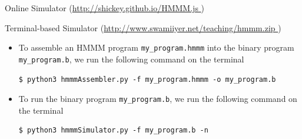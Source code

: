 \documentclass[8pt,a4paper,compress]{beamer}
\begin{document}
\begin{frame}[fragile]
\pause

Online Simulator (\href{http://shickey.github.io/HMMM.js}{http://shickey.github.io/HMMM.js \ExternalLink})

\begin{center}

\bigskip

\end{center}
\end{frame}

\begin{frame}[fragile]
\pause

Terminal-based Simulator (\href{http://www.swamiiyer.net/teaching/hmmm.zip}{http://www.swamiiyer.net/teaching/hmmm.zip \ExternalLink})
\begin{itemize}
\item To assemble an HMMM program \lstinline{my_program.hmmm} into the binary program \lstinline{my_program.b}, we run the following command on the terminal
\begin{lstlisting}[language={}]
$ python3 hmmmAssembler.py -f my_program.hmmm -o my_program.b
\end{lstlisting}

\item To run the binary program \lstinline{my_program.b}, we run the following command on the terminal
\begin{lstlisting}[language={}]
$ python3 hmmmSimulator.py -f my_program.b -n
\end{lstlisting}
\end{itemize}
\end{frame}
\end{document}
